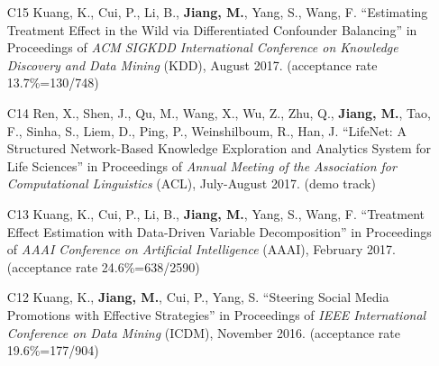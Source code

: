 \documentclass[10pt]{article}
\newenvironment{myindentpar}[1]%
{\begin{list}{}%
         {\setlength{\leftmargin}{#1}}%
         \item[]%
}
{\end{list}}
\newcounter{list}
\begin{document}
\begin{myindentpar}{0.00cm}
\begin{enumerate}[leftmargin=.5cm]
\vspace{-0.1cm}

\item[C15] Kuang, K., Cui, P., Li, B., \textbf{Jiang, M.}, Yang, S., Wang, F. ``Estimating Treatment Effect in the Wild via Differentiated Confounder Balancing'' in Proceedings of \emph{ACM SIGKDD International Conference on Knowledge Discovery and Data Mining} (KDD), August 2017. (acceptance rate 13.7\%=130/748)

\vspace{-0.1cm}

\item[C14] Ren, X., Shen, J., Qu, M., Wang, X., Wu, Z., Zhu, Q., \textbf{Jiang, M.}, Tao, F., Sinha, S., Liem, D., Ping, P., Weinshilboum, R., Han, J. ``LifeNet: A Structured Network-Based Knowledge Exploration and Analytics System for Life Sciences'' in Proceedings of \emph{Annual Meeting of the Association for Computational Linguistics} (ACL), July-August 2017. (demo track)

\vspace{-0.1cm}

\item[C13] Kuang, K., Cui, P., Li, B., \textbf{Jiang, M.}, Yang, S., Wang, F. ``Treatment Effect Estimation with Data-Driven Variable Decomposition'' in Proceedings of \emph{AAAI Conference on Artificial Intelligence} (AAAI), February 2017. (acceptance rate 24.6\%=638/2590)

\vspace{-0.1cm}

\item[C12] Kuang, K., \textbf{Jiang, M.}, Cui, P., Yang, S. ``Steering Social Media Promotions with Effective Strategies'' in Proceedings of \emph{IEEE International Conference on Data Mining} (ICDM), November 2016. (acceptance rate 19.6\%=177/904)


\end{enumerate}
\end{myindentpar}
\end{document}
